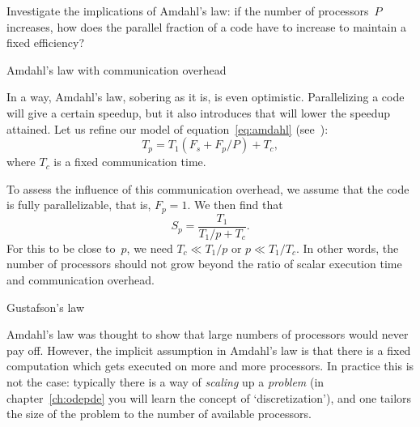 \begin{exercise}
  \label{ex:amdahl-e}
  Investigate the implications of Amdahl's law: if the number of
  processors~$P$ increases, how does the parallel fraction of a code
  have to increase to maintain a fixed efficiency?
\end{exercise}


 {Amdahl's law with communication overhead}

In a way, Amdahl's law, sobering as it is, is even optimistic.
Parallelizing a code will give a certain speedup, but it also
introduces  that will lower the
speedup attained. Let us refine our model of
equation~\eqref{eq:amdahl} (see~\cite[p.~367]{Landau:comp-phys}):
\[ T_p= T_1(F_s+F_p/P) +T_c, \]
where $T_c$ is a fixed communication time.

To assess the influence of this communication overhead, we assume that
the code is fully parallelizable, that is, $F_p=1$. We then find that
\begin{equation}
    S_p=\frac{T_1}{T_1/p+T_c}.
    \label{eq:amdahl-comm}
\end{equation}
For this to be close to~$p$, we need $T_c\ll T_1/p$ or $p\ll
T_1/T_c$. In other words, the number of processors should not grow
beyond the ratio of scalar execution time and communication overhead.

 {Gustafson's law}

Amdahl's law was thought to show that large numbers of processors
would never pay off. However, the implicit assumption in Amdahl's law
is that there is a fixed computation which gets executed on more and
more processors. In practice this is not the case: typically there is
a way of \emph{scaling} up a \emph{problem}
(in chapter~\ref{ch:odepde} you will
learn the concept of `discretization'), and one
tailors the size of the problem to the number of available processors.

